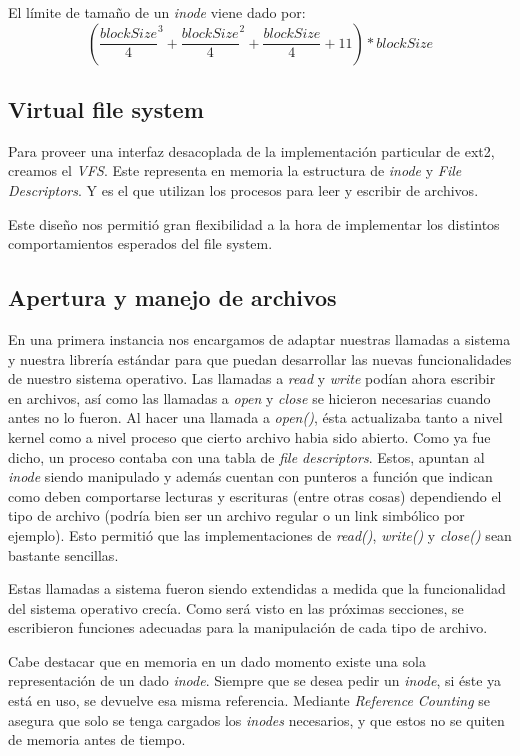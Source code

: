 \documentclass[a4paper,10pt]{article}
\begin{document}
El límite de tamaño de un \textit{inode} viene dado por:
$$( \frac{blockSize}{4}^3 + \frac{blockSize}{4}^2 + \frac{blockSize}{4} + 11 ) * blockSize $$

\subsection{Virtual file system}

Para proveer una interfaz desacoplada de la implementación particular de ext2, creamos el \textit{VFS}.
Este representa en memoria la estructura de \textit{inode} y \textit{File Descriptors}.
Y es el que utilizan los procesos para leer y escribir de archivos.

Este diseño nos permitió gran flexibilidad a la hora de implementar los distintos comportamientos esperados del file system.

\subsection{Apertura y manejo de archivos}
En una primera instancia nos encargamos de adaptar nuestras llamadas a sistema y nuestra librería estándar
para que puedan desarrollar las nuevas funcionalidades de nuestro sistema operativo.
Las llamadas a \textit{read} y \textit{write} podían ahora escribir en archivos, así como las llamadas a \textit{open} y \textit{close} se hicieron
necesarias cuando antes no lo fueron.
Al hacer una llamada a \textit{open()}, ésta actualizaba tanto a nivel kernel como a nivel proceso que cierto archivo habia sido abierto. 
Como ya fue dicho, un proceso contaba con una tabla de \textit{file descriptors}. 
Estos, apuntan al \textit{inode} siendo manipulado y además cuentan con punteros a función que indican como deben comportarse lecturas y escrituras (entre otras cosas) dependiendo el tipo de archivo 
(podría bien ser un archivo regular o un link simbólico por ejemplo). 
Esto permitió que las implementaciones de \textit{read()}, \textit{write()} y \textit{close()} sean bastante sencillas. 
    
Estas llamadas a sistema fueron siendo extendidas a medida que la funcionalidad del sistema operativo crecía. 
Como será visto en las próximas secciones, se escribieron funciones adecuadas para la manipulación de cada tipo de archivo.

Cabe destacar que en memoria en un dado momento existe una sola representación de un dado \textit{inode}.
Siempre que se desea pedir un \textit{inode}, si éste ya está en uso, se devuelve esa misma referencia.
Mediante \textit{Reference Counting} se asegura que solo se tenga cargados los \textit{inodes} necesarios, y que estos no se quiten de memoria antes de tiempo.
\end{document}
